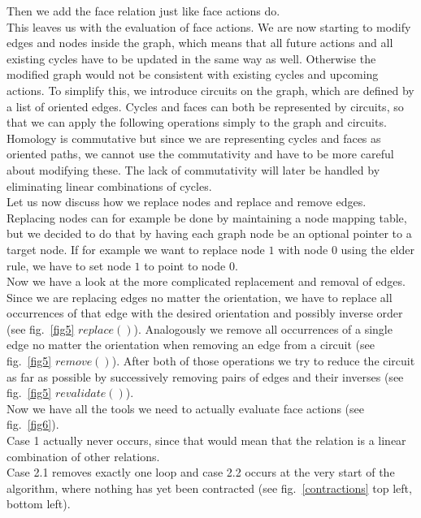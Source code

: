 \documentclass[11pt, a4paper, UKenglish]{article}
\begin{document}
    Then we add the face relation just like face actions do.\\
    This leaves us with the evaluation of face actions.
    We are now starting to modify edges and nodes inside the graph, which means that all future actions and all existing cycles have to be updated in the same way as well.
    Otherwise the modified graph would not be consistent with existing cycles and upcoming actions.
    To simplify this, we introduce circuits on the graph, which are defined by a list of oriented edges.
    Cycles and faces can both be represented by circuits, so that we can apply the following operations simply to the graph and circuits.
    Homology is commutative but since we are representing cycles and faces as oriented paths, we cannot use the commutativity and have to be more careful about modifying these.
    The lack of commutativity will later be handled by eliminating linear combinations of cycles.\\
    Let us now discuss how we replace nodes and replace and remove edges.
    Replacing nodes can for example be done by maintaining a node mapping table, but we decided to do that by having each graph node be an optional pointer to a target node.
    If for example we want to replace node $1$ with node $0$ using the elder rule, we have to set node $1$ to point to node $0$.\\
    Now we have a look at the more complicated replacement and removal of edges.
    Since we are replacing edges no matter the orientation, we have to replace all occurrences of that edge with the desired orientation and possibly inverse order (see fig.\ \ref{fig5} $replace()$).
    Analogously we remove all occurrences of a single edge no matter the orientation when removing an edge from a circuit (see fig.\ \ref{fig5} $remove()$).
    After both of those operations we try to reduce the circuit as far as possible by successively removing pairs of edges and their inverses (see fig.\ \ref{fig5} $revalidate()$).\\
    \newpage
    Now we have all the tools we need to actually evaluate face actions (see fig.\ \ref{fig6}).\\
    
    Case 1 actually never occurs, since that would mean that the relation is a linear combination of other relations.\\
    Case 2.1 removes exactly one loop and case 2.2 occurs at the very start of the algorithm, where nothing has yet been contracted (see fig.\ \ref{contractions} top left, bottom left).\\
\end{document}
